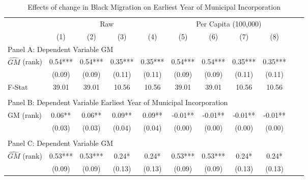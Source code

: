  \begin{table}[htbp]\centering {} \begin{threeparttable} \caption{Effects of change in Black Migration on Earliest Year of Municipal Incorporation} \begin{tabular}{l*{10}{c}} \toprule
                &\multicolumn{4}{c}{Raw}                                    &\multicolumn{4}{c}{Per Capita (100,000)}                   \\\cmidrule(lr){2-5}\cmidrule(lr){6-9}
                &\multicolumn{1}{c}{(1)}   &\multicolumn{1}{c}{(2)}   &\multicolumn{1}{c}{(3)}   &\multicolumn{1}{c}{(4)}   &\multicolumn{1}{c}{(5)}   &\multicolumn{1}{c}{(6)}   &\multicolumn{1}{c}{(7)}   &\multicolumn{1}{c}{(8)}   \\
\cmidrule(lr){1-9}
\multicolumn{8}{l}{Panel A: Dependent Variable GM}\\
\cmidrule(lr){1-9}
$\hat{GM}$ (rank)&       0.54***&       0.54***&       0.35***&       0.35***&       0.54***&       0.54***&       0.35***&       0.35***\\
                &     (0.09)   &     (0.09)   &     (0.11)   &     (0.11)   &     (0.09)   &     (0.09)   &     (0.11)   &     (0.11)   \\
\midrule
F-Stat          &      39.01   &      39.01   &      10.56   &      10.56   &      39.01   &      39.01   &      10.56   &      10.56   \\
\cmidrule[\heavyrulewidth](lr){1-9} \\ \cmidrule[\heavyrulewidth](lr){1-9}
\multicolumn{8}{l}{Panel B: Dependent Variable Earliest Year of Municipal Incorporation}\\
\cmidrule(lr){1-9}
GM  (rank)      &       0.06** &       0.06** &       0.09** &       0.09** &      -0.01** &      -0.01** &      -0.01** &      -0.01** \\
                &     (0.03)   &     (0.03)   &     (0.04)   &     (0.04)   &     (0.00)   &     (0.00)   &     (0.00)   &     (0.00)   \\
\cmidrule[\heavyrulewidth](lr){1-9} \\ \cmidrule[\heavyrulewidth](lr){1-9}
\multicolumn{8}{l}{Panel C: Dependent Variable GM}\\
\cmidrule(lr){1-9}
$\hat{GM}$ (rank)&       0.53***&       0.53***&       0.24*  &       0.24*  &       0.53***&       0.53***&       0.24*  &       0.24*  \\
                &     (0.09)   &     (0.09)   &     (0.13)   &     (0.13)   &     (0.09)   &     (0.09)   &     (0.13)   &     (0.13)   \\

\end{tabular}
\end{threeparttable}
\end{table}

